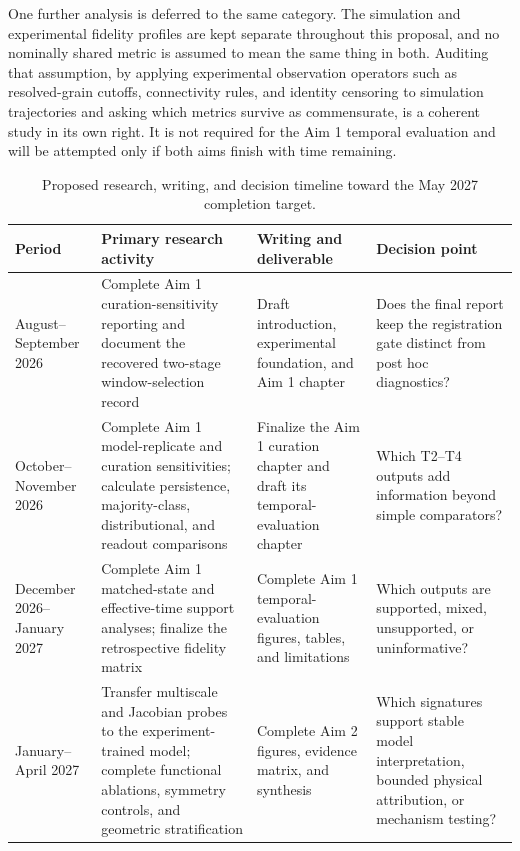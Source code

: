 \documentclass[proposalMode]{ufdissertation}
\begin{document}
One further analysis is deferred to the same category. The simulation and experimental fidelity profiles are kept separate throughout this proposal, and no nominally shared metric is assumed to mean the same thing in both. Auditing that assumption, by applying experimental observation operators such as resolved-grain cutoffs, connectivity rules, and identity censoring to simulation trajectories and asking which metrics survive as commensurate, is a coherent study in its own right. It is not required for the Aim 1 temporal evaluation and will be attempted only if both aims finish with time remaining.

\begin{table}[htbp]
\centering
\caption{Proposed research, writing, and decision timeline toward the May 2027 completion target.}
\label{tab:research-timeline}
\small

\begin{tabularx}{\textwidth}{@{}*{4}{>{\raggedright\arraybackslash}X}@{}}

\toprule

\textbf{Period} & \textbf{Primary research activity} & \textbf{Writing and deliverable} & \textbf{Decision point} \\

\midrule

August--September 2026 & Complete Aim 1 curation-sensitivity reporting and document the recovered two-stage window-selection record & Draft introduction, experimental foundation, and Aim 1 chapter & Does the final report keep the registration gate distinct from post hoc diagnostics? \\

October--November 2026 & Complete Aim 1 model-replicate and curation sensitivities; calculate persistence, majority-class, distributional, and readout comparisons & Finalize the Aim 1 curation chapter and draft its temporal-evaluation chapter & Which T2--T4 outputs add information beyond simple comparators? \\

December 2026--January 2027 & Complete Aim 1 matched-state and effective-time support analyses; finalize the retrospective fidelity matrix & Complete Aim 1 temporal-evaluation figures, tables, and limitations & Which outputs are supported, mixed, unsupported, or uninformative? \\

January--April 2027 & Transfer multiscale and Jacobian probes to the experiment-trained model; complete functional ablations, symmetry controls, and geometric stratification & Complete Aim 2 figures, evidence matrix, and synthesis & Which signatures support stable model interpretation, bounded physical attribution, or mechanism testing? \\


\end{tabularx}
\end{table}
\end{document}
